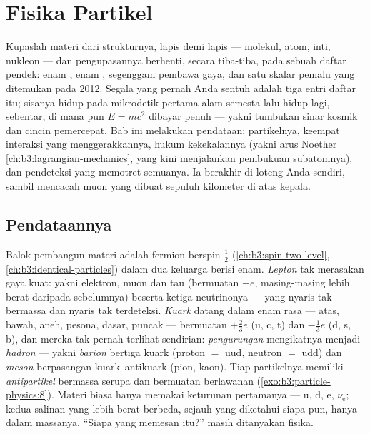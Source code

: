 \chapter{Fisika Partikel}\label{ch:b3:particle-physics}


Kupaslah materi dari strukturnya, lapis demi lapis --- molekul, atom,
inti, nukleon --- dan pengupasannya berhenti, secara tiba-tiba, pada
sebuah daftar pendek: enam \emph{}, enam \emph{}, segenggam
pembawa gaya, dan satu skalar pemalu yang ditemukan pada 2012. Segala
yang pernah Anda sentuh adalah tiga entri daftar itu; sisanya hidup pada
mikrodetik pertama alam semesta lalu hidup lagi, sebentar, di mana pun
$E = mc^2$ dibayar penuh --- yakni tumbukan sinar kosmik dan cincin
pemercepat. Bab ini melakukan pendataan: partikelnya, keempat
interaksi yang menggerakkannya, hukum kekekalannya
(yakni arus Noether \cref{ch:b3:lagrangian-mechanics}, yang kini menjalankan
pembukuan subatomnya), dan pendeteksi yang memotret semuanya. Ia
berakhir di loteng Anda sendiri, sambil mencacah muon yang dibuat sepuluh kilometer di atas kepala.

\section{Pendataannya}

\begin{definition}\label{def:b3:particle-physics:zoo}
Balok pembangun materi adalah fermion berspin $\tfrac12$
(\cref{ch:b3:spin-two-level}, \cref{ch:b3:identical-particles}) dalam
dua keluarga berisi enam. \emph{Lepton} tak merasakan gaya kuat: yakni
elektron, muon dan tau (bermuatan $-e$, masing-masing lebih berat daripada sebelumnya)
beserta ketiga neutrinonya --- yang nyaris tak bermassa dan nyaris
tak terdeteksi. \emph{Kuark} datang dalam enam rasa --- atas, bawah,
aneh, pesona, dasar, puncak --- bermuatan $+\tfrac23e$ (u, c,
t) dan $-\tfrac13e$ (d, s, b), dan mereka tak pernah terlihat sendirian:
\emph{pengurungan} mengikatnya menjadi \emph{hadron} --- yakni
\emph{barion} bertiga kuark (proton $=$ uud, neutron $=$ udd) dan
\emph{meson} berpasangan kuark--antikuark (pion, kaon). Tiap partikelnya memiliki
\emph{antipartikel} bermassa serupa dan bermuatan berlawanan
(\cref{exo:b3:particle-physics:8}). Materi biasa hanya memakai
keturunan pertamanya --- u, d, e, $\nu_{\text{e}}$; kedua salinan yang lebih berat
berbeda, sejauh yang diketahui siapa pun, hanya dalam massanya. ``Siapa
yang memesan itu?'' masih ditanyakan fisika.
\end{definition}

